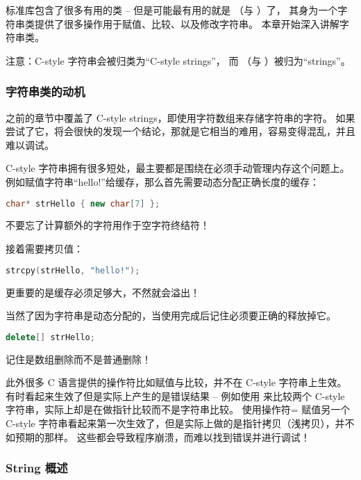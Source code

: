 \documentclass[../../LearnCpp.tex]{subfiles}
\begin{document}

标准库包含了很多有用的类 --
但是可能最有用的就是 （与 ）了，
其身为一个字符串类提供了很多操作用于赋值、比较、以及修改字符串。
本章开始深入讲解字符串类。

注意：C-style 字符串会被归类为“C-style strings”，
而 （与 ）被归为“strings”。

\subsubsection*{字符串类的动机}

之前的章节中覆盖了 C-style strings，即使用字符数组来存储字符串的字符。
如果尝试了它，将会很快的发现一个结论，那就是它相当的难用，容易变得混乱，并且难以调试。

C-style 字符串拥有很多短处，最主要都是围绕在必须手动管理内存这个问题上。
例如赋值字符串“hello!”给缓存，那么首先需要动态分配正确长度的缓存：

\begin{lstlisting}[language=C++]
char* strHello { new char[7] };
\end{lstlisting}

不要忘了计算额外的字符用作于空字符终结符！

接着需要拷贝值：

\begin{lstlisting}[language=C++]
strcpy(strHello, "hello!");
\end{lstlisting}

更重要的是缓存必须足够大，不然就会溢出！

当然了因为字符串是动态分配的，当使用完成后记住必须要正确的释放掉它。

\begin{lstlisting}[language=C++]
delete[] strHello;
\end{lstlisting}

记住是数组删除而不是普通删除！

此外很多 C 语言提供的操作符比如赋值与比较，并不在 C-style 字符串上生效。
有时看起来生效了但是实际上产生的是错误结果 --
例如使用 \acode{==} 来比较两个 C-style 字符串，实际上却是在做指针比较而不是字符串比较。
使用操作符= 赋值另一个 C-style 字符串看起来第一次生效了，但是实际上做的是指针拷贝（浅拷贝），并不如预期的那样。
这些都会导致程序崩溃，而难以找到错误并进行调试！

\subsubsection*{String 概述}
\end{document}
